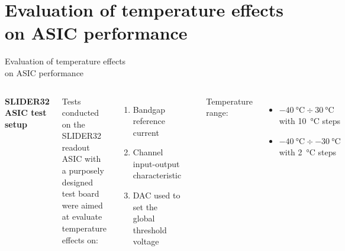 \documentclass[aspectratio=169,xcolor=dvipsnames]{beamer}
\begin{document}

\section{Evaluation of temperature effects on ASIC performance}

\begin{frame}{\vspace{-0.3cm}Evaluation of temperature effects \\on ASIC performance}
\fontsize{8.5pt}{1}\selectfont
    \begin{columns}[T]
        \vskip0.2cm
        \textbf{SLIDER32 ASIC test setup}\\
        \vskip0.15cm
        
        Tests conducted on the SLIDER32 readout ASIC with a purposely designed test board were aimed at evaluate temperature effects on:
        \begin{enumerate}
            \item Bandgap reference current
            \item Channel input-output characteristic
            \item DAC used to set the global threshold voltage
        \end{enumerate}

        \vskip0.05cm
        \includegraphics[width=0.95\textwidth]{images/temperature_effects/test_setup_test_board_csavrefgm_530mv.png}
        \vskip0.2cm

        Temperature range: 
        \begin{itemize}
            \item $\SI{-40}{\celsius} \div \SI{30}{\celsius}$ with \SI{10}{\celsius} steps
            \item $\SI{-40}{\celsius} \div \SI{-30}{\celsius}$ with \SI{2}{\celsius} steps
        \end{itemize}
        

\end{columns}
\end{frame}
\end{document}
